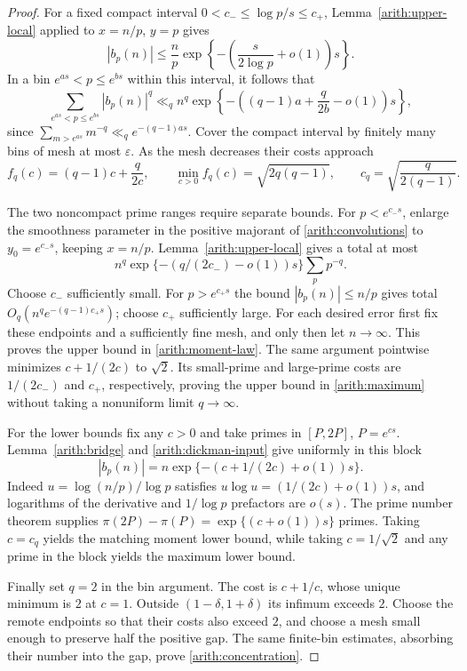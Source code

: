 \begin{proof}
For a fixed compact interval $0<c_-\le\log p/s\le c_+$,
Lemma~\ref{arith:upper-local} applied to $x=n/p$, $y=p$ gives
\[
 |b_p(n)|\le\frac np
 \exp\left\{-\left(\frac{s}{2\log p}+o(1)\right)s\right\}.
\]
In a bin $e^{as}<p\le e^{bs}$ within this interval, it follows that
\begin{equation}\label{arith:bin}
 \sum_{e^{as}<p\le e^{bs}}|b_p(n)|^q
 \ll_q n^q\exp\left\{-\left((q-1)a+\frac q{2b}-o(1)\right)s\right\},
\end{equation}
since $\sum_{m>e^{as}}m^{-q}\ll_q e^{-(q-1)as}$.
Cover the compact interval by finitely many bins of mesh at most $\varepsilon$.
As the mesh decreases their costs approach
\[
 f_q(c)=(q-1)c+\frac q{2c},\qquad
 \min_{c>0}f_q(c)=\sqrt{2q(q-1)},\qquad
 c_q=\sqrt{\frac q{2(q-1)}}.
\]

The two noncompact prime ranges require separate bounds. For $p<e^{c_-s}$,
enlarge the smoothness parameter in the positive majorant of
\eqref{arith:convolutions} to $y_0=e^{c_-s}$, keeping $x=n/p$.
Lemma~\ref{arith:upper-local} gives a total at most
\[
 n^q\exp\{-(q/(2c_-)-o(1))s\}\sum_p p^{-q}.
\]
Choose $c_-$ sufficiently small. For $p>e^{c_+s}$ the bound
$|b_p(n)|\le n/p$ gives total
$O_q(n^qe^{-(q-1)c_+s})$; choose $c_+$ sufficiently large.
For each desired error first fix these endpoints and a sufficiently fine
mesh, and only then let $n\to\infty$.
This proves the upper bound in \eqref{arith:moment-law}.
The same argument pointwise minimizes $c+1/(2c)$ to $\sqrt2$.
Its small-prime and large-prime costs are $1/(2c_-)$ and $c_+$,
respectively, proving the upper bound in \eqref{arith:maximum}
without taking a nonuniform limit $q\to\infty$.

For the lower bounds fix any $c>0$ and take primes in
$[P,2P]$, $P=e^{cs}$. Lemma~\ref{arith:bridge} and
\eqref{arith:dickman-input} give uniformly in this block
\begin{equation}\label{arith:block-law}
 |b_p(n)|=n\exp\{-(c+1/(2c)+o(1))s\}.
\end{equation}
Indeed $u=\log(n/p)/\log p$ satisfies
$u\log u=(1/(2c)+o(1))s$, and logarithms of the derivative and
$1/\log p$ prefactors are $o(s)$.
The prime number theorem supplies
$\pi(2P)-\pi(P)=\exp\{(c+o(1))s\}$ primes.
Taking $c=c_q$ yields the matching moment lower bound, while taking
$c=1/\sqrt2$ and any prime in the block yields the maximum lower bound.

Finally set $q=2$ in the bin argument. The cost is $c+1/c$,
whose unique minimum is $2$ at $c=1$.
Outside $(1-\delta,1+\delta)$ its infimum exceeds $2$.
Choose the remote endpoints so that their costs also exceed $2$,
and choose a mesh small enough to preserve half the positive gap.
The same finite-bin estimates, absorbing their number into the gap,
prove \eqref{arith:concentration}.
\end{proof}

